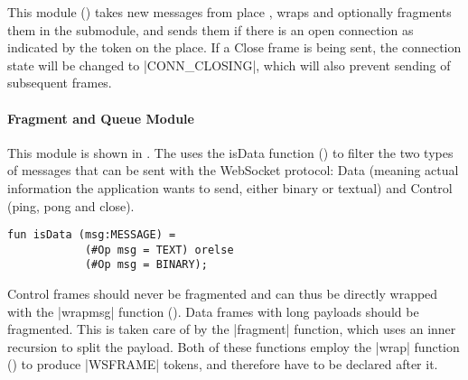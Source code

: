 		
		This module () takes new messages from place
		, wraps and optionally fragments them in the
		 submodule, and sends them if there is an open
		connection as indicated by the token on the 
		place. If a Close frame is being sent, the connection state will be changed to
		|CONN_CLOSING|, which will also prevent sending of subsequent frames.
		
		\paragraph{Fragment and Queue Module}
			
			
			This module is shown in . The 
			 uses the isData function () to filter
			the two types of messages that can be sent with the WebSocket protocol:
			Data (meaning actual information the application wants to send, either
			binary or textual) and Control (ping, pong and close).
			
			\begin{lstlisting}[label=lst:isData,caption=isData,gobble=3,float=h]
			fun isData (msg:MESSAGE) =
			(#Op msg = TEXT) orelse
			(#Op msg = BINARY);
			\end{lstlisting}
			
			Control frames should never be fragmented and can thus be directly wrapped
			with the |wrapmsg| function ().
			Data frames with long payloads should be fragmented. This is taken care of by
			the |fragment| function, which uses an inner recursion to split the payload. 
			Both of these functions employ the |wrap| function ()
			to produce |WSFRAME| tokens, and therefore have to be declared after it.
			
			
			
